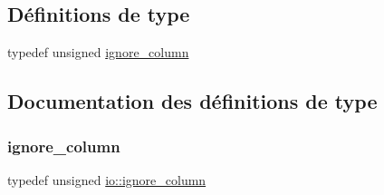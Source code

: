 \subsection*{Définitions de type}
\begin{DoxyCompactItemize}
\item 
typedef unsigned \hyperlink{namespaceio_a544bc96f3a6bf086cb82e599be1a8ebc}{ignore\+\_\+column}
\end{DoxyCompactItemize}


\subsection{Documentation des définitions de type}
\mbox{\label{namespaceio_a544bc96f3a6bf086cb82e599be1a8ebc}} 
\subsubsection{\texorpdfstring{ignore\+\_\+column}{ignore\_column}}
{\footnotesize\ttfamily typedef unsigned \hyperlink{namespaceio_a544bc96f3a6bf086cb82e599be1a8ebc}{io\+::ignore\+\_\+column}}

